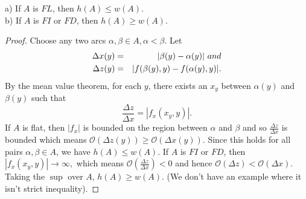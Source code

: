 \documentclass[10pt,a4paper]{amsart}
\begin{document}
\begin{proposition}
a)  If $A$ is $FL$, then $h(A) \le w(A)$.\\
b) If $A$ is $FI$ or $FD$, then $h(A) \ge w(A)$.
\end{proposition}

\begin{proof}
Choose any two arcs $\alpha, \beta \in A, \alpha < \beta$.  Let
\begin{eqnarray*} 
\Delta x(y) &=& |\beta(y) - \alpha(y)| \ {\rm and}\\
\Delta z(y) &=& |f(\beta(y), y) - f(\alpha (y), y)|.
\end{eqnarray*}
By the mean value theorem, for each $y$, there exists an $x_y$ between $\alpha (y)$ and
$\beta (y)$ such that
$$\frac{\Delta z}{\Delta x} = |f_x(x_y, y)|.$$
If $A$ is flat, then $|f_x|$ is bounded on the region between $\alpha$ and $\beta$ and so
$\frac{\Delta z}{\Delta x}$  is bounded which means $\mathcal{O}(\Delta z(y)) \ge \mathcal{O}(\Delta x(y))$. Since this holds for all pairs 
$\alpha, \beta \in A$, we have $h(A) \le w(A)$.  If $A$ is $FI$ or $FD$, then 
$|f_x(x_y, y)| \rightarrow \infty,$ which means $\mathcal{O}(\frac{\Delta z}{\Delta x}) < 0$ 
and hence $\mathcal{O}(\Delta z) < \mathcal{O}(\Delta x)$.  Taking the $\sup$ over $A$, $h(A) \ge w(A)$.  (We don't have an example where it isn't strict inequality).
\end{proof}
\end{document}
